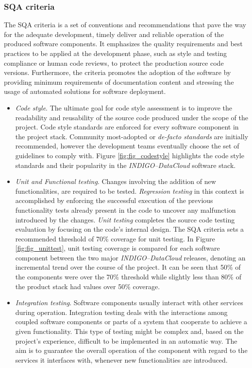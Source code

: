 \documentclass[journal]{IEEEtran}
\begin{document}
\subsubsection{SQA criteria}

The SQA criteria is a set of conventions and recommendations that pave the way for
the adequate development, timely deliver and reliable operation of the produced software components.
It emphasizes the quality requirements and best practices to be applied at the
development phase, such as style and testing compliance or human code reviews, to protect the
production source code versions. Furthermore, the criteria promotes the adoption of the software
by providing minimum requirements of documentation content and stressing the usage of automated
solutions for software deployment.

\begin{itemize}
\item \textit{Code style}.
The ultimate goal for code style assessment is to improve the readability and reusability of the source code produced under the scope of the
project. Code style standards are enforced for every software component in the project stack. Community
most-adopted or \textit{de-facto standards} are initially recommended, however the development teams eventually
choose the set of guidelines to comply with.  Figure \ref{fig:fig_codestyle} highlights the code style standards and their popularity
in the {\sl INDIGO--DataCloud} software stack.

\item \textit{Unit and Functional testing}.
Changes involving the addition of new functionalities, are required to be tested. \textit{Regression
testing} in this context is accomplished by enforcing the successful execution of the previous
functionality tests already present in the code to uncover any malfunction introduced by
the changes. \textit{Unit testing} completes the source code testing evaluation by
focusing on the code's internal design. The SQA criteria sets a recommended threshold of
70\% coverage for unit testing. In Figure \ref{fig:fig_unittest}, unit testing coverage is compared
for each software component between the two major {\sl INDIGO--DataCloud} releases, denoting an incremental
trend over the course of the project. It can be seen that 50\% of the components were over the
70\% threshold while slightly less than 80\% of the product stack had values over 50\% coverage.

\item \textit{Integration testing}. Software components usually interact with other services during
operation. Integration testing deals with the interactions among coupled software components or
parts of a system that cooperate to achieve a given functionality. This type of testing might be
complex and, based on the project's experience, difficult to be implemented in an automatic way. The aim is to
guarantee the overall operation of the component with regard to the services it interfaces with,
whenever new functionalities are introduced.


\end{itemize}
\end{document}
